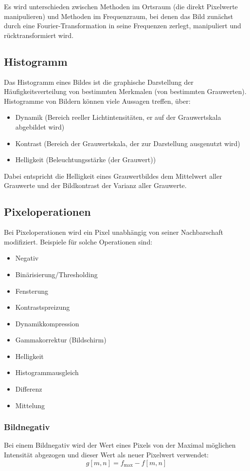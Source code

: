 	Es wird unterschieden zwischen Methoden im Ortsraum (die direkt Pixelwerte manipulieren) und Methoden im Frequenzraum, bei denen das Bild zunächst durch eine Fourier-Transformation in seine Frequenzen zerlegt, manipuliert und rücktransformiert wird.

	\subsection{Histogramm}
		Das Histogramm eines Bildes ist die graphische Darstellung der Häufigkeitsverteilung von bestimmten Merkmalen (\zB von bestimmten Grauwerten). Histogramme von Bildern können viele Aussagen treffen, \zB über:
		\begin{itemize}
			\item Dynamik (Bereich reeller Lichtintensitäten, er auf der Grauwertskala abgebildet wird)
			\item Kontrast (Bereich der Grauwertskala, der zur Darstellung ausgenutzt wird)
			\item Helligkeit (Beleuchtungsstärke (der Grauwert))
		\end{itemize}
		Dabei entspricht die Helligkeit eines Grauwertbildes dem Mittelwert aller Grauwerte und der Bildkontrast der Varianz aller Grauwerte.

	\subsection{Pixeloperationen}
		Bei Pixeloperationen wird ein Pixel unabhängig von seiner Nachbarschaft modifiziert. Beispiele für solche Operationen sind:
		\begin{itemize}
			\item Negativ
			\item Binärisierung/Thresholding
			\item Fensterung
			\item Kontrastspreizung
			\item Dynamikkompression
			\item Gammakorrektur (Bildschirm)
			\item Helligkeit
			\item Histogrammausgleich
			\item Differenz
			\item Mittelung
		\end{itemize}

		\subsubsection{Bildnegativ}
			Bei einem Bildnegativ wird der Wert eines Pixels von der Maximal möglichen Intensität abgezogen und dieser Wert als neuer Pixelwert verwendet:
			\begin{equation*}
				g[m, n] = f_\text{max} - f[m, n]
			\end{equation*}

